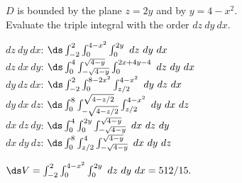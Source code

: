 {\label{13_06_ex_12}$D$ is bounded by the plane $z=2y$ and by $y=4-x^2$.\\

Evaluate the triple integral with the order $dz\ dy\ dx$.

}
{$dz\ dy\ dx$: $\ds\int_{-2}^2\int_{0}^{4-x^2}\int_{0}^{2y}\ dz\ dy\ dx$\\
	$dz\ dx\ dy$: $\ds\int_{0}^4\int_{-\sqrt{4-y}}^{\sqrt{4-y}}\int_{0}^{2x+4y-4}\ dz\ dy\ dx$\\
	$dy\ dz\ dx$: $\ds\int_{-2}^2\int_0^{8-2x^2}\int_{z/2}^{4-x^2}\ dy\ dz\ dx$\\
	$dy\ dx\ dz$: $\ds\int_0^8\int_{-\sqrt{4-z/2}}^{\sqrt{4-z/2}}\int_{z/2}^{4-x^2}\ dy\ dx\ dz$\\
	$dx\ dz\ dy$: $\ds\int_{0}^4\int_{0}^{2y}\int_{-\sqrt{4-y}}^{\sqrt{4-y}}\ dx\ dz\ dy$\\
	$dx\ dy\ dz$: $\ds\int_0^8\int_{z/2}^{4}\int_{-\sqrt{4-y}}^{\sqrt{4-y}}\ dx\ dy\ dz$
	
	$\ds V = \int_{-2}^2\int_{0}^{4-x^2}\int_{0}^{2y}\ dz\ dy\ dx = 512/15.$
}
